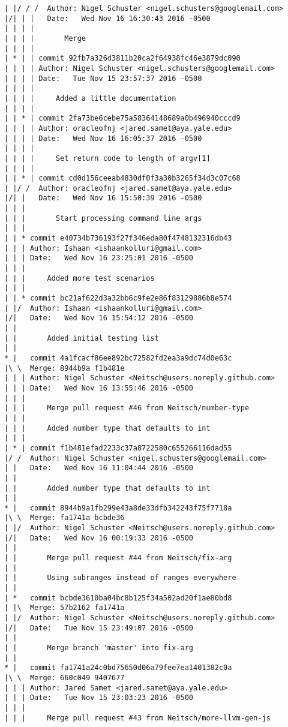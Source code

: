 \begin{lstlisting}
| |/ / /  Author: Nigel Schuster <nigel.schusters@googlemail.com>
|/| | |   Date:   Wed Nov 16 16:30:43 2016 -0500
| | | |   
| | | |       Merge
| | | |     
| * | | commit 92fb7a326d3811b20ca2f64938fc46e3879dc090
| | | | Author: Nigel Schuster <nigel.schusters@googlemail.com>
| | | | Date:   Tue Nov 15 23:57:37 2016 -0500
| | | | 
| | | |     Added a little documentation
| | | |     
| | * | commit 2fa73be6cebe75a58364148689a0b496940cccd9
| | | | Author: oracleofnj <jared.samet@aya.yale.edu>
| | | | Date:   Wed Nov 16 16:05:37 2016 -0500
| | | | 
| | | |     Set return code to length of argv[1]
| | | |     
| | * | commit cd0d156ceeab4830df0f3a30b3265f34d3c07c68
| |/ /  Author: oracleofnj <jared.samet@aya.yale.edu>
|/| |   Date:   Wed Nov 16 15:50:39 2016 -0500
| | |   
| | |       Start processing command line args
| | |    
| | * commit e40734b736193f27f346eda80f4748132316db43
| | | Author: Ishaan <ishaankolluri@gmail.com>
| | | Date:   Wed Nov 16 23:25:01 2016 -0500
| | | 
| | |     Added more test scenarios
| | |    
| | * commit bc21af622d3a32bb6c9fe2e86f83129886b8e574
| |/  Author: Ishaan <ishaankolluri@gmail.com>
|/|   Date:   Wed Nov 16 15:54:12 2016 -0500
| |   
| |       Added initial testing list
| |     
* |   commit 4a1fcacf86ee892bc72582fd2ea3a9dc74d0e63c
|\ \  Merge: 8944b9a f1b481e
| | | Author: Nigel Schuster <Neitsch@users.noreply.github.com>
| | | Date:   Wed Nov 16 13:55:46 2016 -0500
| | | 
| | |     Merge pull request #46 from Neitsch/number-type
| | |     
| | |     Added number type that defaults to int
| | |    
| * | commit f1b481efad2233c37a8722580c655266116dad55
|/ /  Author: Nigel Schuster <nigel.schusters@googlemail.com>
| |   Date:   Wed Nov 16 11:04:44 2016 -0500
| |   
| |       Added number type that defaults to int
| |     
* |   commit 8944b9a1fb299e43a8de33dfb342243f75f7718a
|\ \  Merge: fa1741a bcbde36
| |/  Author: Nigel Schuster <Neitsch@users.noreply.github.com>
|/|   Date:   Wed Nov 16 00:19:33 2016 -0500
| |   
| |       Merge pull request #44 from Neitsch/fix-arg
| |       
| |       Using subranges instead of ranges everywhere
| |     
| *   commit bcbde3610ba04bc8b125f34a502ad20f1ae80bd8
| |\  Merge: 57b2162 fa1741a
| |/  Author: Nigel Schuster <Neitsch@users.noreply.github.com>
|/|   Date:   Tue Nov 15 23:49:07 2016 -0500
| |   
| |       Merge branch 'master' into fix-arg
| |     
* |   commit fa1741a24c0bd75650d06a79fee7ea1401382c0a
|\ \  Merge: 660c049 9407677
| | | Author: Jared Samet <jared.samet@aya.yale.edu>
| | | Date:   Tue Nov 15 23:03:23 2016 -0500
| | | 
| | |     Merge pull request #43 from Neitsch/more-llvm-gen-js

\end{lstlisting}
